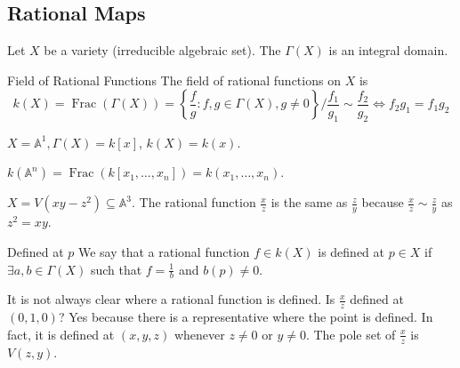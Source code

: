 \documentclass{report}
\begin{document}
\begin{topic}
    \section{Rational Maps}
\end{topic}

Let $X$ be a variety (irreducible algebraic set). The $\Gamma(X)$ is an integral domain.

\begin{definition}{Field of Rational Functions}
    The field of rational functions on $X$ is 
        \begin{equation*}
            k(X) = \mathop{Frac}(\Gamma(X)) = \left\{\dfrac{f}{g} : f, g \in \Gamma(X), g \neq 0\right\}/ \dfrac{f_{1}}{g_{1}} \sim \dfrac{f_{2}}{g_{2}} \iff f_{2}g_{1} = f_{1}g_{2}
        \end{equation*}
\end{definition}

\begin{examples}
    \begin{example}
        $X = \mathbb{A}^{1}, \Gamma(X) = k[x]$, $k(X) = k(x)$.

        $k(\mathbb{A}^{n}) = \mathop{Frac}(k[x_{1}, \ldots , x_{n}]) = k(x_{1}, \ldots , x_{n})$.
    \end{example}
    \begin{example}
        $X = V(xy - z^{2}) \subseteq \mathbb{A}^{3}$. The rational function $\frac{x}{z}$ is the same as $\frac{z}{y}$ because $\frac{x}{z} \sim \frac{z}{y}$ as $z^{2} = xy$.
    \end{example}
\end{examples}

\begin{definition}{Defined at $p$}
    We say that a rational function $f \in k(X)$ is defined at $p \in X$ if $\exists a, b \in \Gamma(X)$ such that $f = \frac{1}{b}$ and $b(p) \neq 0$.
\end{definition} 

\begin{examples}
    \begin{example}
        It is not always clear where a rational function is defined. Is $\frac{x}{z}$ defined at $(0, 1, 0)$? Yes because there is a representative where the point is defined. In fact, it is defined at $(x, y, z)$ whenever $z \neq 0$ or $y \neq 0$. The pole set of $\frac{x}{z}$ is $V(z, y)$.
    \end{example}
\end{examples}
\end{document}
